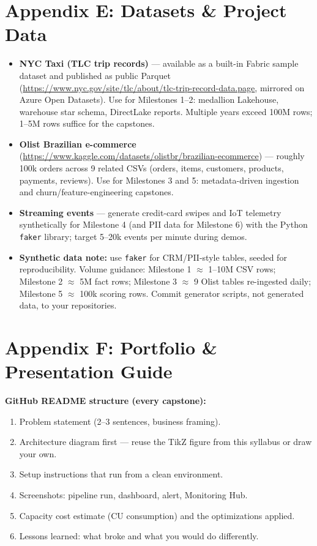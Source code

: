 \documentclass[11pt, a4paper]{article}
\begin{document}
\section{Appendix E: Datasets \& Project Data}
\begin{itemize}[label=-]
    \item \textbf{NYC Taxi (TLC trip records)} --- available as a built-in Fabric sample dataset and published as public Parquet (\url{https://www.nyc.gov/site/tlc/about/tlc-trip-record-data.page}, mirrored on Azure Open Datasets). Use for Milestones 1--2: medallion Lakehouse, warehouse star schema, DirectLake reports. Multiple years exceed 100M rows; 1--5M rows suffice for the capstones.
    \item \textbf{Olist Brazilian e-commerce} (\url{https://www.kaggle.com/datasets/olistbr/brazilian-ecommerce}) --- roughly 100k orders across 9 related CSVs (orders, items, customers, products, payments, reviews). Use for Milestones 3 and 5: metadata-driven ingestion and churn/feature-engineering capstones.
    \item \textbf{Streaming events} --- generate credit-card swipes and IoT telemetry synthetically for Milestone 4 (and PII data for Milestone 6) with the Python \texttt{faker} library; target 5--20k events per minute during demos.
    \item \textbf{Synthetic data note:} use \texttt{faker} for CRM/PII-style tables, seeded for reproducibility. Volume guidance: Milestone 1 $\approx$ 1--10M CSV rows; Milestone 2 $\approx$ 5M fact rows; Milestone 3 $\approx$ 9 Olist tables re-ingested daily; Milestone 5 $\approx$ 100k scoring rows. Commit generator scripts, not generated data, to your repositories.
\end{itemize}

\section{Appendix F: Portfolio \& Presentation Guide}

\noindent\textbf{GitHub README structure (every capstone):}
\begin{enumerate}[leftmargin=8mm, itemsep=0pt]
    \item Problem statement (2--3 sentences, business framing).
    \item Architecture diagram first --- reuse the TikZ figure from this syllabus or draw your own.
    \item Setup instructions that run from a clean environment.
    \item Screenshots: pipeline run, dashboard, alert, Monitoring Hub.
    \item Capacity cost estimate (CU consumption) and the optimizations applied.
    \item Lessons learned: what broke and what you would do differently.
\end{enumerate}
\end{document}
